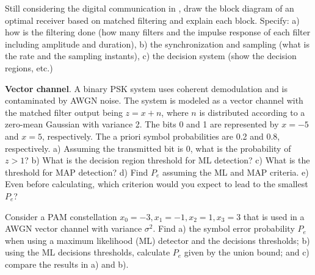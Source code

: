 \begin{exercises}
\item Still considering  the digital communication in , draw the block diagram of an optimal receiver based on matched filtering and explain each block. Specify: a) how is the filtering done (how many filters and the impulse response of each filter including amplitude and duration), b) the synchronization and sampling (what is the rate and the sampling instants), c) the decision system (show the decision regions, etc.)

\item \textbf{Vector channel}.
A binary PSK system uses coherent demodulation and is contaminated by AWGN noise. The system is modeled as a vector channel with the matched filter output being $z=x+n$, where $n$ is distributed according to a zero-mean Gaussian with variance 2. The bits 0 and 1 are represented by $x=-5$ and $x=5$, respectively. The a priori symbol probabilities are 0.2 and 0.8, respectively. a) Assuming the transmitted bit is 0, what is the probability of $z>1$? b) What is the decision region threshold for ML detection? c) What is the threshold for MAP detection? d) Find $P_e$ assuming the ML and MAP criteria. e) Even before calculating, which criterion would you expect to lead to the smallest $P_e$?

\item Consider a PAM constellation $x_0=-3, x_1=-1, x_2=1, x_3=3$ that is used in a AWGN vector channel with variance $\sigma^2$. Find a) the symbol error probability $P_e$ when using a maximum likelihood (ML) detector and the decisions thresholds; b) using the ML decisions thresholds, calculate $P_e$ given by the union bound; and c) compare the results in a) and b).

\end{exercises}

